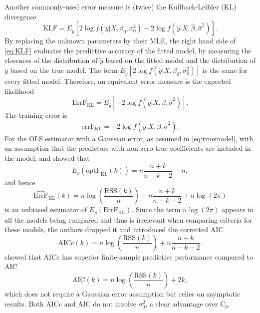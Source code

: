 Another commonly-used error measure is (twice) the Kullback-Leibler (KL) divergence \citep[see, e.g.,][Section 3]{konishi2008information}
\begin{equation}
\text{KLF} = E_{\tilde{y}}\left[ 2\log f(\tilde{y} | X,\beta_0,\sigma_0^2 ) - 2\log f(\tilde{y} | X,\hat\beta,\hat\sigma^2 ) \right].
\label{eq:KLF}
\end{equation}
By replacing the unknown parameters by their MLE, the right hand side of \eqref{eq:KLF} evaluates the predictive accuracy of the fitted model, by measuring the closeness of the distribution of $\tilde{y}$ based on the fitted model and the distribution of $\tilde{y}$ based on the true model. The term $E_{\tilde{y}}\left[ 2\log f(\tilde{y} | X,\beta_0,\sigma_0^2 ) \right]$ is the same for every fitted model. Therefore, an equivalent error measure is the expected likelihood
\begin{equation*}
\text{ErrF}_\text{KL} = E_{\tilde{y}}\left[ -2\log f(\tilde{y} | X,\hat\beta,\hat\sigma^2 ) \right].
\end{equation*}
The training error is 
\begin{equation*}
\text{errF}_\text{KL} = -2\log f(y|X,\hat\beta,\hat\sigma^2).
\end{equation*}
For the OLS estimator with a Gaussian error, as assumed in \eqref{eq:truemodel}, with an assumption that the predictors with non-zero true coefficients are included in the model, \citet{sugiura1978further} and \citet{hurvich1989regression} showed that
\begin{equation*}
E_y(\text{optF}_\text{KL}(k)) = n\frac{n+k}{n-k-2}-n,
\end{equation*}
and hence
\begin{equation*}
\widehat{\text{ErrF}}_\text{KL}(k) = n\log\left(\frac{\text{RSS}(k)}{n}\right) + n\frac{n+k}{n-k-2} + n\log(2\pi)
\end{equation*}
is an unbiased estimator of $E_y(\text{ErrF}_\text{KL})$. Since the term $n\log(2\pi)$ appears in all the models being compared and thus is irrelevant when comparing criteria for these models, the authors dropped it and introduced the corrected AIC
\begin{equation}
\text{AICc}(k) = n \log\left( \frac{\text{RSS}(k)}{n}\right) + n\frac{n+k}{n-k-2}.
\label{eq:aicc_subsetselection}
\end{equation}
\citet{hurvich1989regression} showed that AICc has superior finite-sample predictive performance compared to AIC \citep{Akaike1973}
\begin{equation*}
\text{AIC}(k) = n \log\left( \frac{\text{RSS}(k)}{n}\right) + 2k,
\end{equation*}
which does not require a Gaussian error assumption but relies on asymptotic results. Both AICc and AIC do not involve $\sigma_0^2$, a clear advantage over C$_p$. 

